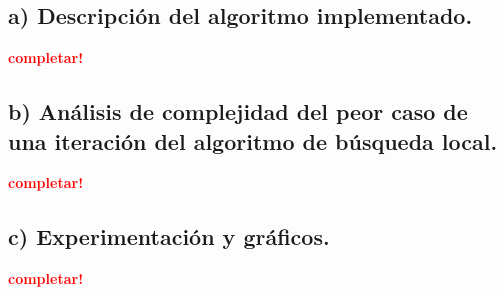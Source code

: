 \subsection{a) Descripción del algoritmo implementado.}
\vspace*{0.3cm}
\textcolor{red}{\textbf{completar!}}



\newpage
\subsection{b) Análisis de complejidad del peor caso de una iteración del
            algoritmo de búsqueda local.}
\vspace*{0.3cm}
\textcolor{red}{\textbf{completar!}}



\newpage
\subsection{c) Experimentación y gráficos.}
\vspace*{0.3cm}
\textcolor{red}{\textbf{completar!}}
